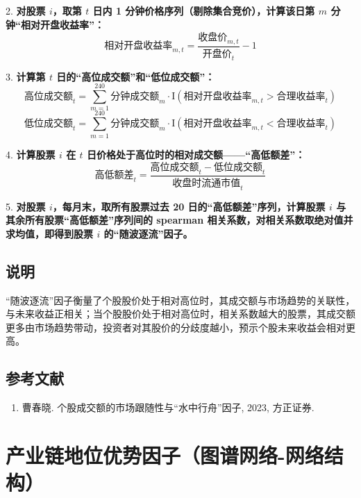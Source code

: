 \documentclass{article}
\begin{document}
2. \textbf{对股票 \(i\)，取第 \(t\) 日内 1 分钟价格序列（剔除集合竞价），计算该日第 \(m\) 分钟“相对开盘收益率”：}
   \begin{equation}
       \text{相对开盘收益率}_{m,t} = \frac{\text{收盘价}_{m,t}}{\text{开盘价}_t} - 1
   \end{equation}

3. \textbf{计算第 \(t\) 日的“高位成交额”和“低位成交额”：}
   \begin{equation}
       \text{高位成交额}_t = \sum_{m=1}^{240} \text{分钟成交额}_m \cdot \mathrm{I}\left( \text{相对开盘收益率}_{m,t} > \text{合理收益率}_t \right)
   \end{equation}
   \begin{equation}
       \text{低位成交额}_t = \sum_{m=1}^{240} \text{分钟成交额}_m \cdot \mathrm{I}\left( \text{相对开盘收益率}_{m,t} < \text{合理收益率}_t \right)
   \end{equation}

4. \textbf{计算股票 \(i\) 在 \(t\) 日价格处于高位时的相对成交额——“高低额差”：}
   \begin{equation}
       \text{高低额差}_t = \frac{\text{高位成交额}_t - \text{低位成交额}_t}{\text{收盘时流通市值}_t}
   \end{equation}

5. \textbf{对股票 \(i\)，每月末，取所有股票过去 20 日的“高低额差”序列，计算股票 \(i\) 与其余所有股票“高低额差”序列间的 spearman 相关系数，对相关系数取绝对值并求均值，即得到股票 \(i\) 的“随波逐流”因子。}

\subsection{说明}
“随波逐流”因子衡量了个股股价处于相对高位时，其成交额与市场趋势的关联性，与未来收益正相关；当个股股价处于相对高位时，相关系数越大的股票，其成交额更多由市场趋势带动，投资者对其股价的分歧度越小，预示个股未来收益会相对更高。

\subsection{参考文献}
\begin{enumerate}
    \item 曹春晓. 个股成交额的市场跟随性与“水中行舟”因子, 2023, 方正证券.
\end{enumerate}

\section{产业链地位优势因子（图谱网络-网络结构）}
\end{document}
